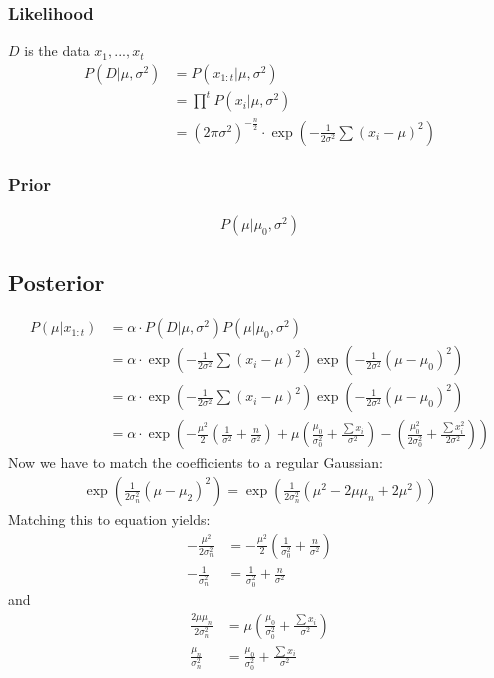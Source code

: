 \documentclass{article}
\begin{document}
\subsubsection{Likelihood}
$D$ is the data ${x_1,...,x_t}$
\begin{align}
    P(D|\mu, \sigma^2) &= P(x_{1:t}|\mu, \sigma^2)
    \\
    &= \prod^t P(x_i|\mu, \sigma^2)
    \\
    &= (2\pi\sigma^2)^{-\frac{n}{2}}\cdot \exp ( -\frac{1}{2\sigma^2}\sum(x_i-\mu)^2)
\end{align}

\subsubsection{Prior}
\begin{align}
    P(\mu|\mu_0, \sigma^2)
\end{align}

\subsection{Posterior}
\begin{align}
    P(\mu|x_{1:t}) &= \alpha \cdot P(D|\mu, \sigma^2) P(\mu|\mu_0, \sigma^2)
    \\
    &= \alpha \cdot \exp ( -\frac{1}{2\sigma^2}\sum(x_i-\mu)^2) \exp ( -\frac{1}{2\sigma^2}(\mu-\mu_0)^2)
    \\
    &= \alpha \cdot \exp ( -\frac{1}{2\sigma^2}\sum(x_i-\mu)^2) \exp ( -\frac{1}{2\sigma^2}(\mu-\mu_0)^2)
    \\
    &= \alpha \cdot \exp ( -\frac{\mu^2}{2}(\frac{1}{\sigma^2}+\frac{n}{\sigma^2}) + \mu(\frac{\mu_0}{\sigma_0^2}+\frac{\sum x_i}{\sigma^2}) - (\frac{\mu_0^2}{2\sigma_0^2} + \frac{\sum x_i^2}{2\sigma^2})
    )\label{posteriorMurphy}
\end{align}
Now we have to match the coefficients to a regular Gaussian:
\begin{align}
    \exp (\frac{1}{2\sigma_n^2}(\mu-\mu_2)^2) = \exp (\frac{1}{2\sigma_n^2}(\mu^2 - 2\mu\mu_n + 2\mu^2))
\end{align}
Matching this to equation \cite{posteriorMurphy} yields:
\begin{align}
    -\frac{\mu^2}{2\sigma_n^2} &= -\frac{\mu^2}{2}(\frac{1}{\sigma_0^2} + \frac{n}{\sigma^2}) 
    \\
 -\frac{1}{\sigma_n^2} &= \frac{1}{\sigma_0^2} + \frac{n}{\sigma^2} 
\end{align}
and
\begin{align}
    \frac{2\mu\mu_n}{2\sigma_n^2} &= \mu(\frac{\mu_0}{\sigma_0^2}+\frac{\sum x_i}{\sigma^2})
    \\
    \frac{\mu_n}{\sigma_n^2} &= \frac{\mu_0}{\sigma_0^2}+\frac{\sum x_i}{\sigma^2}
\end{align}
\end{document}
